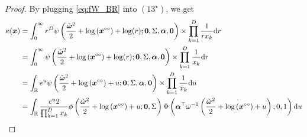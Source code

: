 \documentclass[12pt]{article}
\begin{document}
\begin{proof}
By plugging \eqref{eq:fW_BR} into $(13^\star)$, we get
%
\begin{align*}
\kappa(\bm x) &= \int_0^\infty r^D \psi\left( \frac{\tilde{\bm \omega}^2}{2} + \log\left(\bm x^{\circ\circ}\right) + \log(r); \bm 0, \Sigma, \bm \alpha, \bm 0\right) \times \prod_{k=1}^D \frac{1}{r x_k} \text dr \\
&= \int_0^\infty \psi\left( \frac{\tilde{\bm \omega}^2}{2} + \log\left(\bm x^{\circ\circ}\right) + \log(r); \bm 0, \Sigma, \bm \alpha, \bm 0\right) \times \prod_{k=1}^D \frac{1}{x_k} \text dr \\
&= \int_{\mathbb{R}} e^{u} \psi\left( \frac{\tilde{\bm \omega}^2}{2} + \log\left(\bm x^{\circ\circ}\right) + u; \bm 0, \Sigma, \bm \alpha, \bm 0\right) \times \prod_{k=1}^D \frac{1}{x_k} \text du \\
&= \int_{\mathbb{R}} \frac{e^{u} 2}{\prod_{k=1}^D x_k} \phi\left( \frac{\tilde{\bm \omega}^2}{2} + \log\left(\bm x^{\circ\circ}\right) + u; \bm 0, \Sigma\right) \Phi\left( \bm \alpha^\top \omega^{-1} \left( \frac{\tilde{\bm \omega}^2}{2} + \log\left(\bm x^{\circ\circ}\right) + u \right); 0, 1\right) \text du \\
\end{align*}


\end{proof}
\end{document}
